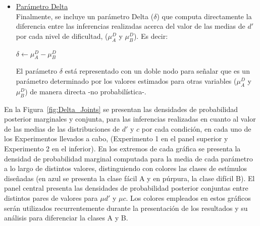 \begin{itemize}
\item \underline{Parámetro Delta}\\

Finalmente, se incluye un parámetro Delta ($\delta$) que computa directamente la diferencia entre las inferencias realizadas acerca del valor de las medias de $d'$ por cada nivel de dificultad, ($\mu^D_{A}$ y $\mu^D_{B}$). Es decir:\\

\begin{center}
$\delta \gets \mu^D_{A}-\mu^D_{B}$\\
\end{center}

El parámetro $\delta$ está representado con un doble nodo para señalar que es un parámetro determinado por los valores estimados para otras variables ($\mu^D_{A}$ y $\mu^D_{B}$) de manera directa -no probabilística-.\\
\end{itemize} 

En la Figura~\ref{fig:Delta_Joints} se presentan las densidades de probabilidad posterior marginales y conjunta, para las inferencias realizadas en cuanto al valor de las medias de las distribuciones de $d'$ y $c$ por cada condición, en cada uno de los Experimentos llevados a cabo, (Experimento 1 en el panel superior y Experimento 2 en el inferior). En los extremos de cada gráfica se presenta la densidad de probabilidad marginal computada para la media de cada parámetro a lo largo de distintos valores, distinguiendo con colores las clases de estímulos diseñadas (en azul se presenta la clase fácil A y en púrpura, la clase difícil B). El panel central presenta las densidades de probabilidad posterior conjuntas entre distintos pares de valores para $\mu d'$ y $\mu c$. Los colores empleados en estos gráficos serán utilizados recurrentemente durante la presentación de los resultados y su análisis para diferenciar la clases A y B.\\ 

